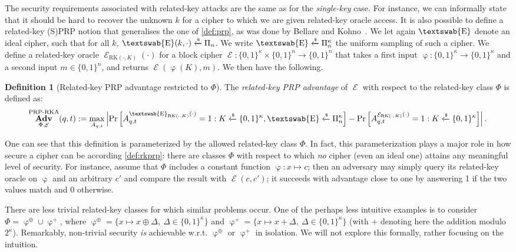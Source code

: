 \documentclass[11pt,a4paper]{article}
\theoremstyle{definition}
\newtheorem{defi}{Definition}
\DeclareMathOperator\E{\mathcal{E}}
\DeclareMathOperator\iE{\textswab{E}}
\DeclareMathOperator\Adv{\mathbf{Adv}}
\DeclareMathOperator\rkf{\varphi}
\newcommand\msb{\{0,1\}^n}
\newcommand\ksb{\{0,1\}^\kappa}
\newcommand\allperms{\Pi_n}
\newcommand\allpermfams{\Pi_n^\kappa}
\newcommand\randraw{\xleftarrow{{\scriptscriptstyle\$}}}
\begin{document}
The security requirements associated with related-key attacks are the same as for the \emph{single-key} case. For instance, we can informally state that
it should be hard to recover the unknown $k$ for a cipher to which we are given related-key oracle access. It is also possible to define a
related-key (S)PRP notion that generalises the one of \autoref{def:prp}, as was done by Bellare and Kohno~\cite{DBLP:conf/eurocrypt/BellareK03}.
We let again $\iE$ denote an ideal cipher, such that for all $k$,
$\iE(k,\cdot) \randraw \allperms$. We write $\iE \randraw \allpermfams$ the uniform sampling of such a cipher.
We define a related-key oracle $\E_{\text{RK}(\cdot,K)}(\cdot)$ for a block cipher $\E : \ksb \times \msb \rightarrow
\msb$ that takes a first input $\rkf : \ksb \rightarrow \ksb$ and a second input $m \in \msb$, and returns $\E(\rkf(K), m)$.
We then have the following.

\begin{defi}[Related-key PRP advantage restricted to $\Phi$]
\label{def:rkprp}
The \emph{related-key PRP advantage} of $\E$ with respect to the related-key class $\Phi$ is defined as:
\[
\Adv^\text{PRP-RKA}_{\Phi,\E}(q,t) := \max_{A_{q,t}} \left|\Pr\left[A_{q,t}^{\iE_{\text{RK}(\cdot,K)}(\cdot)} = 1 : K \randraw \ksb, \iE \randraw \allpermfams\right] -
\Pr\left[A_{q,t}^{\E_{\text{RK}(\cdot,K)}(\cdot)} = 1 : K \randraw \ksb\right]\right|.
\]
\end{defi}

One can see that this definition is parameterized by the allowed related-key class $\Phi$. In fact, this parameterization plays a major role in how secure
a cipher can be according \autoref{def:rkprp}: there are classes $\Phi$ with respect to which \emph{no} cipher (even an ideal one)
attains any meaningful level of security. For instance, assume that $\Phi$ includes a constant function $\rkf : x \mapsto c$; then an adversary
may simply query its related-key oracle on $\rkf$ and an arbitrary $c'$ and compare the result with $\E(c,c')$; it succeeds with
advantage close to one by answering 1 if the two values match and 0 otherwise.

There are less trivial related-key classes for which similar problems occur. One of the perhaps less intuitive examples is to consider
$\Phi = \rkf^\oplus \cup \rkf^+$, where $\rkf^\oplus = \{x \mapsto x \oplus \Delta,~\Delta \in \ksb\}$ and $\rkf^+ = \{x \mapsto x + \Delta,~\Delta \in \ksb\}$
(with $+$ denoting here the addition modulo $2^\kappa$). Remarkably, non-trivial security \emph{is} achievable w.r.t. $\rkf^\oplus$ or $\rkf^+$
in isolation. We will not explore this formally, rather focusing on the intuition.
\end{document}
